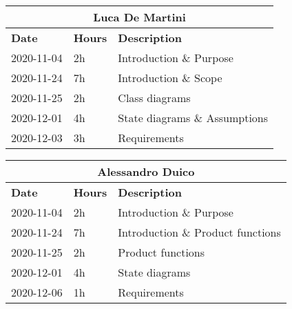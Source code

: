 
\begin{table}[H]
    \centering
    \begin{tabular}{|l|l|l|}
        \multicolumn{3}{c}{\textbf{Luca De Martini}}\\
        \hline
        \textbf{Date} & \textbf{Hours} & \textbf{Description}    \\\hline
        2020-11-04    & 2h             & Introduction \& Purpose \\\hline
        2020-11-24    & 7h             & Introduction \& Scope \\\hline
        2020-11-25    & 2h             & Class diagrams \\\hline
        2020-12-01    & 4h             & State diagrams \& Assumptions \\\hline
        2020-12-03    & 3h             & Requirements \\\hline
    \end{tabular}
\end{table}
\begin{table}[H]
    \centering
    \begin{tabular}{|l|l|l|}
        \multicolumn{3}{c}{\textbf{Alessandro Duico}}\\
        \hline
        \textbf{Date} & \textbf{Hours} & \textbf{Description}    \\\hline
        2020-11-04    & 2h             & Introduction \& Purpose \\\hline
        2020-11-24    & 7h             & Introduction \& Product functions \\\hline
        2020-11-25    & 2h             & Product functions \\\hline
        2020-12-01    & 4h             & State diagrams \\\hline
        2020-12-06    & 1h             & Requirements \\\hline
    \end{tabular}
\end{table}